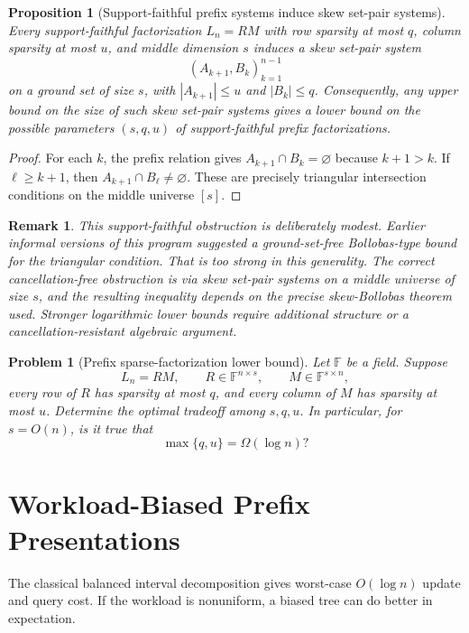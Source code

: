 \documentclass[11pt]{article}
\newtheorem{proposition}[theorem]{Proposition}
\newtheorem{remark}[theorem]{Remark}
\newtheorem{problem}[theorem]{Problem}
\begin{document}
\begin{proposition}[Support-faithful prefix systems induce skew set-pair systems]
Every support-faithful factorization $L_n=RM$ with row sparsity at most $q$, column sparsity at most $u$, and middle dimension $s$ induces a skew set-pair system
\[
(A_{k+1},B_k)_{k=1}^{n-1}
\]
on a ground set of size $s$, with $|A_{k+1}|\le u$ and $|B_k|\le q$. Consequently, any upper bound on the size of such skew set-pair systems gives a lower bound on the possible parameters $(s,q,u)$ of support-faithful prefix factorizations.
\end{proposition}

\begin{proof}
For each $k$, the prefix relation gives $A_{k+1}\cap B_k=\varnothing$ because $k+1>k$. If $\ell\ge k+1$, then $A_{k+1}\cap B_\ell\ne\varnothing$. These are precisely triangular intersection conditions on the middle universe $[s]$.
\end{proof}

\begin{remark}
This support-faithful obstruction is deliberately modest. Earlier informal versions of this program suggested a ground-set-free Bollobas-type bound for the triangular condition. That is too strong in this generality. The correct cancellation-free obstruction is via skew set-pair systems on a middle universe of size $s$, and the resulting inequality depends on the precise skew-Bollobas theorem used. Stronger logarithmic lower bounds require additional structure or a cancellation-resistant algebraic argument.
\end{remark}

\begin{problem}[Prefix sparse-factorization lower bound]
Let $\mathbb F$ be a field. Suppose
\[
L_n=RM,
\qquad
R\in\mathbb F^{n\times s},
\qquad
M\in\mathbb F^{s\times n},
\]
every row of $R$ has sparsity at most $q$, and every column of $M$ has sparsity at most $u$. Determine the optimal tradeoff among $s,q,u$. In particular, for $s=O(n)$, is it true that
\[
\max\{q,u\}=\Omega(\log n)?
\]
\end{problem}

\section{Workload-Biased Prefix Presentations}

The classical balanced interval decomposition gives worst-case $O(\log n)$ update and query cost. If the workload is nonuniform, a biased tree can do better in expectation.
\end{document}
